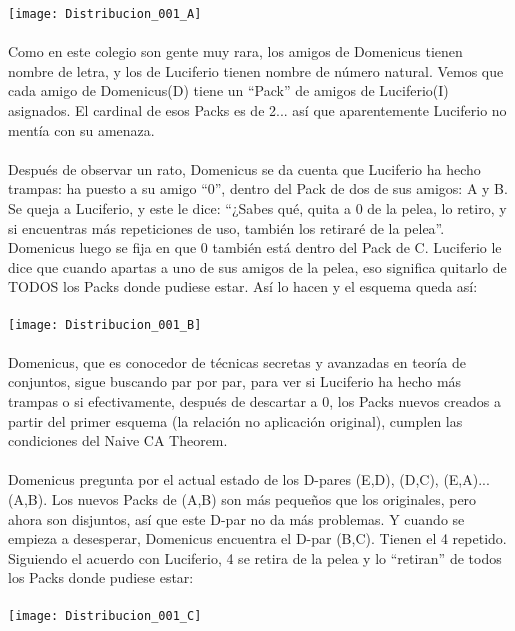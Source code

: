	\noindent
	\texttt{[image: Distribucion\_001\_A]}\\\\
	Como en este colegio son gente muy rara, los amigos de Domenicus tienen nombre de letra, y los de Luciferio tienen nombre de número natural. Vemos que cada amigo de Domenicus(D) tiene un ``Pack'' de amigos de Luciferio(I) asignados. El cardinal de esos Packs es de 2... así que aparentemente Luciferio no mentía con su amenaza.
	\\\\
	
	\noindent
	Después de observar un rato, Domenicus se da cuenta que Luciferio ha hecho trampas: ha puesto a su amigo ``$0$'', dentro del Pack de dos de sus amigos: A y B. Se queja a Luciferio, y este le dice: ``¿Sabes qué, quita a $0$ de la pelea, lo retiro, y si encuentras más repeticiones de uso, también los retiraré de la pelea''. Domenicus luego se fija en que $0$ también está dentro del Pack de C. Luciferio le dice que cuando apartas a uno de sus amigos de la pelea, eso significa quitarlo de TODOS los Packs donde pudiese estar. Así lo hacen y el esquema queda así:\\\\
	\texttt{[image: Distribucion\_001\_B]}
	\\\\
	
	\noindent
	Domenicus, que es conocedor de técnicas secretas y avanzadas en teoría de conjuntos, sigue buscando par por par, para ver si Luciferio ha hecho más trampas o si efectivamente, después de descartar a $0$, los Packs nuevos creados a partir del primer esquema (la relación no aplicación original), cumplen las condiciones del Naive CA Theorem.
	\\\\
	
	\noindent
	Domenicus pregunta por el actual estado de los D-pares (E,D), (D,C), (E,A)... (A,B). Los nuevos Packs de (A,B) son más pequeños que los originales, pero ahora son disjuntos, así que este D-par no da más problemas. Y cuando se empieza a desesperar, Domenicus encuentra el D-par (B,C). Tienen el 4 repetido. Siguiendo el acuerdo con Luciferio, 4 se retira de la pelea y lo ``retiran'' de todos los Packs donde pudiese estar:
	\\\\
	
	\noindent
	\texttt{[image: Distribucion\_001\_C]}
	\\\\
	
